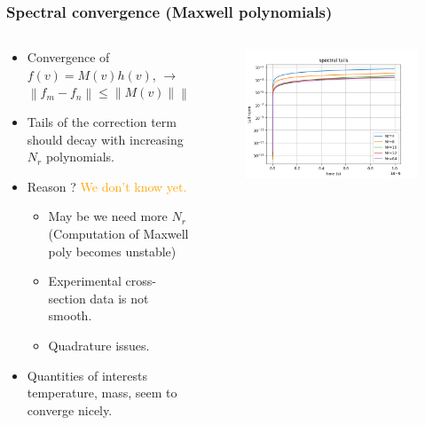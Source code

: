 \documentclass[mathserif, aspectratio=169]{beamer}
\newcommand{\norm}[1]{\left\lVert#1\right\rVert}
\begin{document}
	\begin{frame}
		\frametitle{Spectral convergence (Maxwell polynomials)}
		\begin{columns}
			\begin{column}{0.48\textwidth}
				\begin{itemize}
					\item Convergence of $f(v) = M(v) h(v)$,  $\rightarrow$ $\norm{f_{m}- f_{n}} \leq \norm{M(v)} \norm{h_m-h_n}$
					\item Tails of the correction term should decay with increasing $N_r$ polynomials.
					\item Reason ? \textcolor{orange}{We don't know yet.}
					\begin{itemize}
						\item May be we need more $N_r$ (Computation of Maxwell poly becomes unstable)
						\item Experimental cross-section data is not smooth. 
						\item Quadrature issues.
					\end{itemize}
					\item Quantities of interests temperature, mass, seem to converge nicely. 
				\end{itemize}
			\end{column}
			\begin{column}{0.48\textwidth}
				\begin{figure}
					\centering
					\includegraphics[width=\textwidth]{g0_mw_tails.png}
				\end{figure}
			\end{column}
		\end{columns}
	\end{frame}
\end{document}
